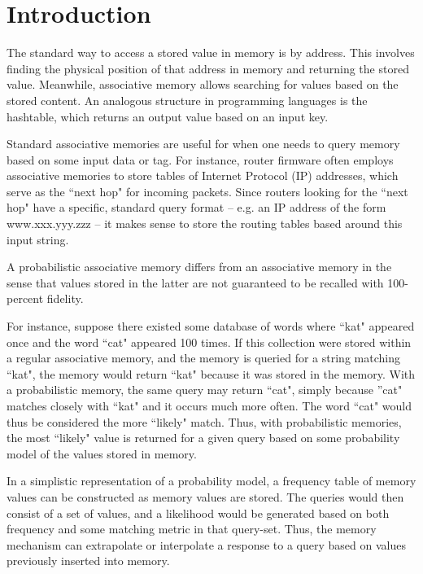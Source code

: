 \documentclass{sig-alternate}
\begin{document}
\section{Introduction}
\label{sec:intro}

The standard way to access a stored value in memory is by address. 
This involves finding the physical position of that address in memory
and returning the stored value. Meanwhile, associative memory allows
searching for values based on the stored content. An analogous structure
in programming languages is the hashtable, which returns an output value
based on an input key. 

Standard associative memories are useful for when one needs to query memory based 
on some input data or tag. For instance, router firmware often employs associative 
memories to store tables of Internet Protocol (IP) addresses, which serve as the ``next hop" for incoming 
packets. Since routers looking for the ``next hop" have a specific, standard query 
format -- e.g. an IP address of the form www.xxx.yyy.zzz -- it makes sense to store the 
routing tables based around this input string.

A probabilistic associative memory differs from an associative memory in the sense that 
values stored in the latter are not guaranteed to be recalled with 100-percent fidelity.

For instance, suppose there existed some database of words where ``kat" appeared once and the word ``cat" appeared 100 times.
If this collection were stored within a regular associative memory, and the memory is queried for a string matching ``kat", the memory 
would return ``kat" because it was stored in the memory. With a probabilistic memory, the same query may return ``cat", simply because 
''cat" matches closely with ``kat" and it occurs much more often. The word ``cat" would thus be considered the more ``likely" match.
Thus, with probabilistic memories, the most ``likely" value is returned for a given query based on some probability model of the values
stored in memory.

In a simplistic representation of a probability model, a frequency table of memory values can be constructed as memory values are stored.
The queries would then consist of a set of values, and a likelihood would be generated based on both frequency and some matching metric in that query-set.
Thus, the memory mechanism can extrapolate or interpolate a response to a query based on values 
previously inserted into memory. 
\end{document}
